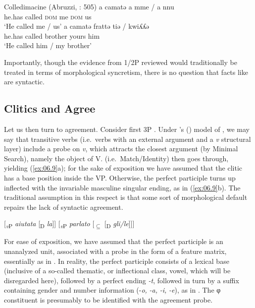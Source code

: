 \documentclass[output=paper]{langsci/langscibook}
\begin{document}
\ea%
    \label{ex:06.8}  Colledimacine (Abruzzi, \citealt{ManziniSavoia2005}: 505)
    \ea
	\gll    a   camatə   a mme / a nnu\\
            he.has  called  \textsc{dom} me {} \textsc{dom} us\\
	\glt    ‘He called me / us’
 	\ex
	\gll    a   camatə   frattə tiə / kwiʎʎə\\
            he.has  called   brother yours {} him\\
	\glt    ‘He called him / my brother’
    \z
\z

Importantly, though the evidence from  1/2P  reviewed
would traditionally be treated in terms of morphological syncretism, there is
no question that facts like  are syntactic.

\subsection{Clitics and Agree}\label{sec:06.1.2}

Let us then turn to agreement. Consider first 3P . Under
\citeauthor{Chomsky2000}'s (\citeyear{Chomsky2000,Chomsky2001}) model of
, we may say that transitive verbs (i.e.\ verbs with an external
argument and a \emph{v} structural layer) include a probe on \emph{v}, which
attracts the closest argument (by Minimal Search), namely the object of V.
 (i.e.\ Match/Identity) then goes through, yielding
(\ref{ex:06.9}a); for the sake of exposition we have assumed that the
clitic has a base position inside the VP. Otherwise, the perfect participle
turns up inflected with the invariable masculine singular ending, as in
(\ref{ex:06.9}b). The traditional assumption in this respect is that some
sort of morphological default repairs the lack of syntactic agreement.

\ea%
    \label{ex:06.9}
    \ea {}[\textsubscript{\emph{v}P} \emph{aiutata} [\textsubscript{D} \emph{la}]]
    \ex {}[\textsubscript{\emph{v}P} \emph{parlato} [\textsubscript{${\subseteq}$} [\textsubscript{D} \emph{gli/le}]]]\\
    \z
\z

For ease of exposition, we have assumed that the perfect participle is an
unanalyzed unit, associated with a probe in the form of a feature matrix,
essentially as in \citet{Chomsky1995}. In reality, the perfect participle
consists of a lexical base (inclusive of a so-called thematic, or inflectional
class, vowel, which will be disregarded here), followed by a perfect ending
\emph{-t}, followed in turn by a suffix containing gender and number
information (-\emph{o,} \emph{-a,} \emph{-i,} \emph{-e}), as in
. The φ constituent is presumably to be identified
with the agreement probe.
\end{document}
